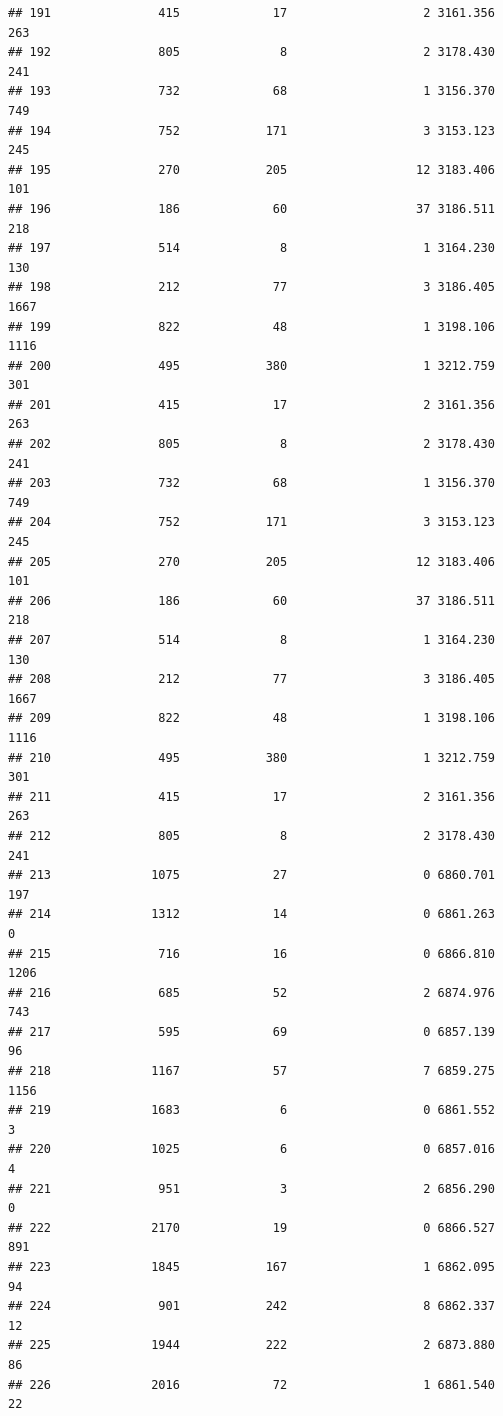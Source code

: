 \documentclass[
]{article}
\begin{document}
\begin{verbatim}
## 191               415             17                   2 3161.356  263
## 192               805              8                   2 3178.430  241
## 193               732             68                   1 3156.370  749
## 194               752            171                   3 3153.123  245
## 195               270            205                  12 3183.406  101
## 196               186             60                  37 3186.511  218
## 197               514              8                   1 3164.230  130
## 198               212             77                   3 3186.405 1667
## 199               822             48                   1 3198.106 1116
## 200               495            380                   1 3212.759  301
## 201               415             17                   2 3161.356  263
## 202               805              8                   2 3178.430  241
## 203               732             68                   1 3156.370  749
## 204               752            171                   3 3153.123  245
## 205               270            205                  12 3183.406  101
## 206               186             60                  37 3186.511  218
## 207               514              8                   1 3164.230  130
## 208               212             77                   3 3186.405 1667
## 209               822             48                   1 3198.106 1116
## 210               495            380                   1 3212.759  301
## 211               415             17                   2 3161.356  263
## 212               805              8                   2 3178.430  241
## 213              1075             27                   0 6860.701  197
## 214              1312             14                   0 6861.263    0
## 215               716             16                   0 6866.810 1206
## 216               685             52                   2 6874.976  743
## 217               595             69                   0 6857.139   96
## 218              1167             57                   7 6859.275 1156
## 219              1683              6                   0 6861.552    3
## 220              1025              6                   0 6857.016    4
## 221               951              3                   2 6856.290    0
## 222              2170             19                   0 6866.527  891
## 223              1845            167                   1 6862.095   94
## 224               901            242                   8 6862.337   12
## 225              1944            222                   2 6873.880   86
## 226              2016             72                   1 6861.540   22

\end{verbatim}
\end{document}
